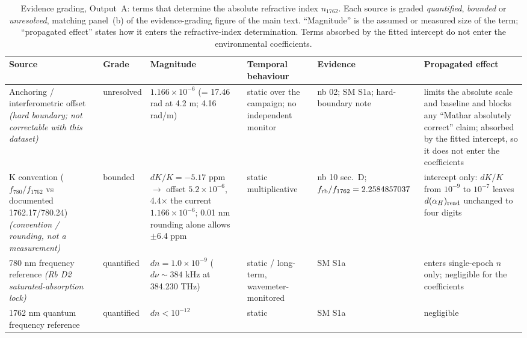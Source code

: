 
\begin{table}[htbp]
\centering
\caption{Evidence grading, Output~A: terms that determine the absolute refractive index $n_{1762}$. Each source is graded \emph{quantified}, \emph{bounded} or \emph{unresolved}, matching panel~(b) of the evidence-grading figure of the main text. ``Magnitude'' is the assumed or measured size of the term; ``propagated effect'' states how it enters the refractive-index determination. Terms absorbed by the fitted intercept do not enter the environmental coefficients.}
\label{tab:S4a}
\footnotesize
\setlength{\tabcolsep}{4pt}
\begin{tabular}{@{}p{}p{}p{}p{}p{}p{}@{}}
\hline
\textbf{Source} & \textbf{Grade} & \textbf{Magnitude} & \textbf{Temporal behaviour} & \textbf{Evidence} & \textbf{Propagated effect} \\
\hline
Anchoring / interferometric offset \emph{(hard boundary; not correctable with this dataset)} & unresolved & $1.166\times10^{-6}$ (= 17.46 rad at 4.2 m; 4.16 rad/m) & static over the campaign; no independent monitor & nb 02; SM S1a; hard-boundary note & limits the absolute scale and baseline and blocks any ``Mathar absolutely correct'' claim; absorbed by the fitted intercept, so it does not enter the coefficients \\
K convention ($f_{780}/f_{1762}$ vs documented 1762.17/780.24) \emph{(convention / rounding, not a measurement)} & bounded & $dK/K = -5.17$ ppm $\to$ offset $5.2\times10^{-6}$, 4.4$\times$ the current $1.166\times10^{-6}$; 0.01 nm rounding alone allows $\pm$6.4 ppm & static multiplicative & nb 10 sec.~D; $f_{\rm rb}/f_{1762} = 2.2584857037$ & intercept only: $dK/K$ from $10^{-9}$ to $10^{-7}$ leaves $d(\alpha_H)_{\rm read}$ unchanged to four digits \\
780 nm frequency reference \emph{(Rb D2 saturated-absorption lock)} & quantified & $dn = 1.0\times10^{-9}$ ($d\nu \sim 384$ kHz at 384.230 THz) & static / long-term, wavemeter-monitored & SM S1a & enters single-epoch $n$ only; negligible for the coefficients \\
1762 nm quantum frequency reference & quantified & $dn < 10^{-12}$ & static & SM S1a & negligible \\

\end{tabular}
\end{table}
